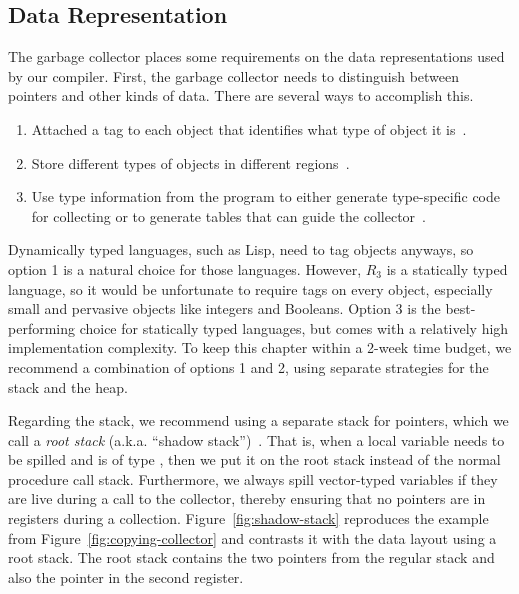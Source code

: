 \documentclass[11pt]{book}
\begin{document}
\subsection{Data Representation}
\label{sec:data-rep-gc}

The garbage collector places some requirements on the data
representations used by our compiler. First, the garbage collector
needs to distinguish between pointers and other kinds of data. There
are several ways to accomplish this.
\begin{enumerate}
\item Attached a tag to each object that identifies what type of
  object it is~\citep{McCarthy:1960dz}.
\item Store different types of objects in different
  regions~\citep{Steele:1977ab}.
\item Use type information from the program to either generate
  type-specific code for collecting or to generate tables that can
  guide the
  collector~\citep{Appel:1989aa,Goldberg:1991aa,Diwan:1992aa}.
\end{enumerate}
Dynamically typed languages, such as Lisp, need to tag objects
anyways, so option 1 is a natural choice for those languages.
However, $R_3$ is a statically typed language, so it would be
unfortunate to require tags on every object, especially small and
pervasive objects like integers and Booleans.  Option 3 is the
best-performing choice for statically typed languages, but comes with
a relatively high implementation complexity. To keep this chapter
within a 2-week time budget, we recommend a combination of options 1
and 2, using separate strategies for the stack and the heap.

Regarding the stack, we recommend using a separate stack for pointers,
which we call a \emph{root stack} (a.k.a. ``shadow
stack'')~\citep{Siebert:2001aa,Henderson:2002aa,Baker:2009aa}. That
is, when a local variable needs to be spilled and is of type
, then we put it on the root
stack instead of the normal procedure call stack. Furthermore, we
always spill vector-typed variables if they are live during a call to
the collector, thereby ensuring that no pointers are in registers
during a collection. Figure~\ref{fig:shadow-stack} reproduces the
example from Figure~\ref{fig:copying-collector} and contrasts it with
the data layout using a root stack. The root stack contains the two
pointers from the regular stack and also the pointer in the second
register.
\end{document}
